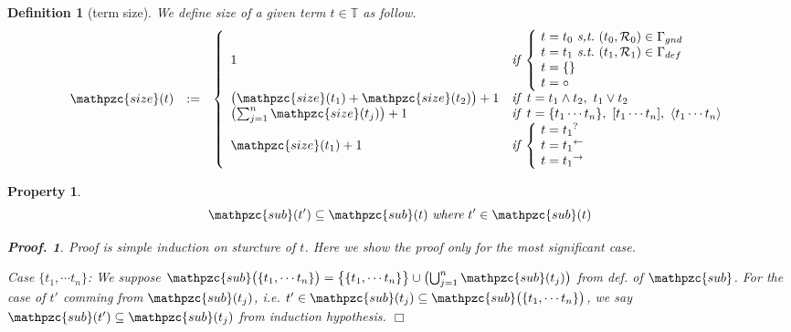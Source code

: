 \documentclass[12pt]{article}
\newtheorem{Definition}{Definition}[section]
\newtheorem{Property}{Property}[section]
\newtheorem{Proof}{Proof.}
\begin{document}
\begin{Definition}[term size]
  We define size of a given term $t \in \mathbb{T}$ as follow.
  \begin{displaymath}
    \begin{array}{lll}
      \mathpzc{size}(t) &:=
      & \left\{ \begin{array}{ll}
          1  & \text{\it if}\;
                \left\{ \! \begin{array}{l}
                  t = t_0\ \text{\it s,t.}\
                   (t_0, \mathcal{R}_0) \in \Gamma_{gnd}  \\
                  t = t_1\ \text{\it s.t.}\
                   (t_1, \mathcal{R}_1) \in \Gamma_{def}  \\
                  t = \{\}  \\
                  t = \circ
                \end{array} \right.  \\
          \bigl(\mathpzc{size}(t_1) + \mathpzc{size}(t_2) \bigr) + 1  &
           \text{\it if}\;\; t = t_1 \wedge t_2,\ t_1 \vee t_2  \\
          \bigl(\sum_{j=1}^{n} \mathpzc{size}(t_j) \bigr) + 1  &
           \text{\it if}\;\; t = \{t_1 \cdots t_n \},
            \ [t_1 \cdots t_n ], \ \langle t_1 \cdots t_n \rangle  \\
          \mathpzc{size}(t_1) + 1  &
           \text{\it if}\; \left\{ \! \begin{array}{l}
             t = {t_1}^?  \\
             t = {t_1}^\leftarrow \\
             t = {t_1}^\rightarrow
           \end{array} \right.
        \end{array} \right.
    \end{array}
  \end{displaymath}
\end{Definition}


\begin{Property}
  \label{self_similarity_on_subterms}
  \[ \mathpzc{sub}(t') \subseteq \mathpzc{sub}(t)\ \text{\it where}\
      t' \in \mathpzc{sub}(t)
  \]
  \begin{Proof}
    Proof is simple induction on sturcture of $t$.
    Here we show the proof only for the most significant case.
    
    Case $\{t_1, \cdots t_n\}$:
    We suppose $\mathpzc{sub}\bigl(\{t_1, \cdots t_n\} \bigr) =
    \bigl\{\{t_1, \cdots t_n\} \bigr\} \cup
    \bigl(\bigcup_{j=1}^n \mathpzc{sub}(t_j) \bigr)$ from def. of
    $\mathpzc{sub}$. For the case of $t'$ comming from
    $\mathpzc{sub}(t_j)$, i.e. $t' \in \mathpzc{sub}(t_j) \subseteq
    \mathpzc{sub}\bigl(\{t_1, \cdots t_n\} \bigr)$, we say
    $\mathpzc{sub}(t') \subseteq \mathpzc{sub}(t_j)$ from
    induction hypothesis.
    $\Box$
  \end{Proof}
\end{Property}
\end{document}
